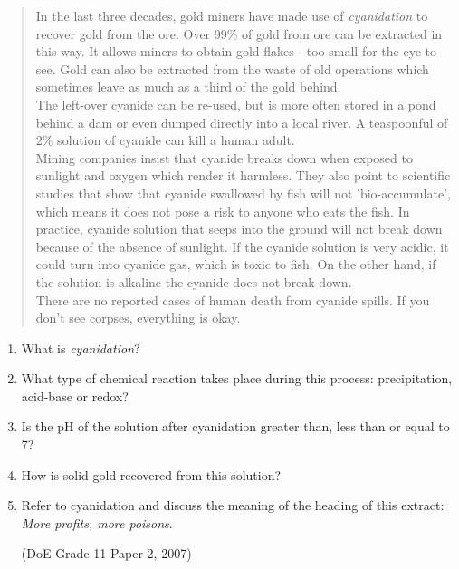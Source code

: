 \begin{eocexercises}{}
\begin{enumerate}
{\begin{quote}
{In the last three decades, gold miners have made use of \textit{cyanidation} to recover gold from the ore. Over 99\% of gold from ore can be extracted in this way. It allows miners to obtain gold flakes - too small for the eye to see. Gold can also be extracted from the waste of old operations which sometimes leave as much as a third of the gold behind.\\

The left-over cyanide can be re-used, but is more often stored in a pond behind a dam or even dumped directly into a local river. A teaspoonful of 2\% solution of cyanide can kill a human adult.\\

Mining companies insist that cyanide breaks down when exposed to sunlight and oxygen which render it harmless. They also point to scientific studies that show that cyanide swallowed by fish will not 'bio-accumulate', which means it does not pose a risk to anyone who eats the fish. In practice, cyanide solution that seeps into the ground will not break down because of the absence of sunlight. If the cyanide solution is very acidic, it could turn into cyanide gas, which is toxic to fish. On the other hand, if the solution is alkaline the cyanide does not break down.\\

There are no reported cases of human death from cyanide spills. If you don't see corpses, everything is okay.
}
\end{quote}
}
	\begin{enumerate}
	\item{What is \textit{cyanidation}?}
	\item{What type of chemical reaction takes place during this process: precipitation, acid-base or redox?}
	\item{Is the pH of the solution after cyanidation greater than, less than or equal to 7?}
	\item{How is solid gold recovered from this solution?}
	\item{Refer to cyanidation and discuss the meaning of the heading of this extract: \textit{More profits, more poisons}.}

(DoE Grade 11 Paper 2, 2007)
	\end{enumerate}
\end{enumerate}

\practiceinfo
\end{eocexercises}






